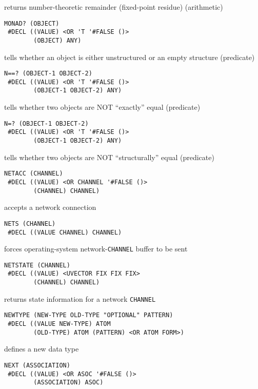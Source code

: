 \documentclass[a4paper,]{article}
\begin{document}
returns number-theoretic remainder (fixed-point residue) (arithmetic)

\begin{verbatim}
MONAD? (OBJECT)
 #DECL ((VALUE) <OR 'T '#FALSE ()>
        (OBJECT) ANY)
\end{verbatim}

tells whether an object is either unstructured or an empty structure (predicate)

\begin{verbatim}
N==? (OBJECT-1 OBJECT-2)
 #DECL ((VALUE) <OR 'T '#FALSE ()>
        (OBJECT-1 OBJECT-2) ANY)
\end{verbatim}

tells whether two objects are NOT ``exactly'' equal (predicate)

\begin{verbatim}
N=? (OBJECT-1 OBJECT-2)
 #DECL ((VALUE) <OR 'T '#FALSE ()>
        (OBJECT-1 OBJECT-2) ANY)
\end{verbatim}

tells whether two objects are NOT ``structurally'' equal (predicate)

\begin{verbatim}
NETACC (CHANNEL)
 #DECL ((VALUE) <OR CHANNEL '#FALSE ()>
        (CHANNEL) CHANNEL)
\end{verbatim}

accepts a network connection

\begin{verbatim}
NETS (CHANNEL)
 #DECL ((VALUE CHANNEL) CHANNEL)
\end{verbatim}

forces operating-system network-\texttt{CHANNEL} buffer to be sent

\begin{verbatim}
NETSTATE (CHANNEL)
 #DECL ((VALUE) <UVECTOR FIX FIX FIX>
        (CHANNEL) CHANNEL)
\end{verbatim}

returns state information for a network \texttt{CHANNEL}

\begin{verbatim}
NEWTYPE (NEW-TYPE OLD-TYPE "OPTIONAL" PATTERN)
 #DECL ((VALUE NEW-TYPE) ATOM
        (OLD-TYPE) ATOM (PATTERN) <OR ATOM FORM>)
\end{verbatim}

defines a new data type

\begin{verbatim}
NEXT (ASSOCIATION)
 #DECL ((VALUE) <OR ASOC '#FALSE ()>
        (ASSOCIATION) ASOC)
\end{verbatim}
\end{document}
